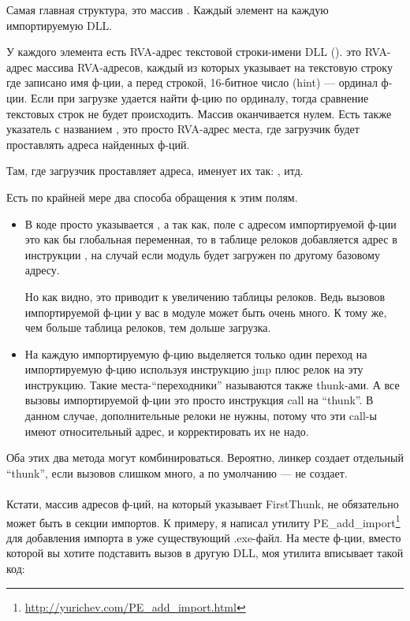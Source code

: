 Самая главная структура, это массив . Каждый элемент на каждую импортируемую DLL.

У каждого элемента есть \ac{RVA}-адрес текстовой строки-имени DLL ().  это \ac{RVA}-адрес
массива \ac{RVA}-адресов, каждый из которых указывает на текстовую строку где записано имя ф-ции, а перед строкой, 
16-битное число (hint) --- ординал ф-ции. Если при загрузке удается найти ф-цию по ординалу, тогда сравнение текстовых
строк не будет происходить. Массив оканчивается нулем. Есть также указатель с названием , 
это просто \ac{RVA}-адрес места, где загрузчик будет проставлять адреса найденных ф-ций.

Там, где загрузчик проставляет адреса, \IDA именует их так: , итд.

Есть по крайней мере два способа обращения к этим полям.

\begin{itemize}
\item
В коде просто указывается , а так как, поле с адресом импортируемой ф-ции это
как бы глобальная переменная, то в таблице релоков добавляется адрес в инструкции , 
на случай если модуль будет загружен по другому базовому адресу.

Но как видно, это приводит к увеличению таблицы релоков. Ведь вызовов импортируемой ф-ции у вас в модуле может быть
очень много. К тому же, чем больше таблица релоков, тем дольше загрузка.

\item
На каждую импортируемую ф-цию выделяется только один переход на импортируемую ф-цию используя инструкцию jmp плюс 
релок на эту инструкцию. Такие места-``переходники'' называются также thunk-ами. 
А все вызовы импортируемой ф-ции это просто инструкция call на ``thunk''. В данном случае, дополнительные релоки
не нужны, потому что эти call-ы имеют относительный адрес, и корректировать их не надо.
\end{itemize}

Оба этих два метода могут комбинироваться. 
Вероятно, линкер создает отдельный ``thunk'', если вызовов слишком много, а по умолчанию --- не создает. \\
\\
Кстати, массив адресов ф-ций, на который указывает FirstThunk, не обязательно может быть в секции импортов.
К примеру, я написал утилиту PE\_add\_import\footnote{\url{http://yurichev.com/PE_add_import.html}} для добавления
импорта в уже существующий .exe-файл. На месте ф-ции, вместо которой вы хотите подставить вызов в другую DLL,
моя утилита вписывает такой код:

